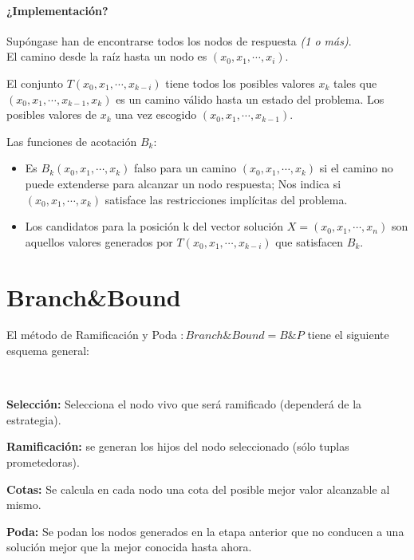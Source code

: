 \documentclass[tikz,11pt,fleqn]{book} %
\begin{document}
\subsubsection{¿Implementación?}
\begin{definition}[Implementación]

	Supóngase han de encontrarse todos los nodos de respuesta \textit{(1 o más)}.\\

	El camino desde la raíz hasta un nodo es $(x_0,x_1,\cdots,x_i)$.

	El conjunto $T(x_0,x_1,\cdots,x_{k-i})$ tiene todos los posibles valores $x_k$ tales que $(x_0,x_1,\cdots,x_{k-1},x_k)$ es un camino válido hasta un estado del problema. Los posibles valores
	de $x_k$ una vez escogido $(x_0,x_1,\cdots,x_{k-1})$.

	Las funciones de acotación $B_k$:
	\begin{itemize}
		\item Es $B_k(x_0,x_1,\cdots,x_k)$ falso para un camino $(x_0,x_1,\cdots, x_k)$ si el camino no puede extenderse para alcanzar un nodo respuesta; Nos indica si $(x_0,x_1,\cdots,x_k)$ satisface las restricciones implícitas del problema.

		\item Los candidatos para la posición k del vector solución $X=(x_0,x_1,\cdots,x_n)$ son aquellos valores generados por $T(x_0,x_1,\cdots,x_{k-i})$ que satisfacen $B_k$.
	\end{itemize}
\end{definition}

\chapter{Branch\&Bound}
El método de Ramificación y Poda $:Branch\&Bound=B\&P$ tiene el siguiente esquema general:

\begin{theorem}~

	\textbf{Selección:} Selecciona el nodo vivo que será ramificado (dependerá de la estrategia).

	\textbf{Ramificación:} se generan los hijos del nodo seleccionado (sólo tuplas prometedoras).

	\textbf{Cotas:} Se calcula en cada nodo una cota del posible mejor valor alcanzable al mismo.

	\textbf{Poda:} Se podan los nodos generados en la etapa anterior que no conducen a una solución mejor que la mejor conocida hasta ahora.
\end{theorem}
\end{document}
